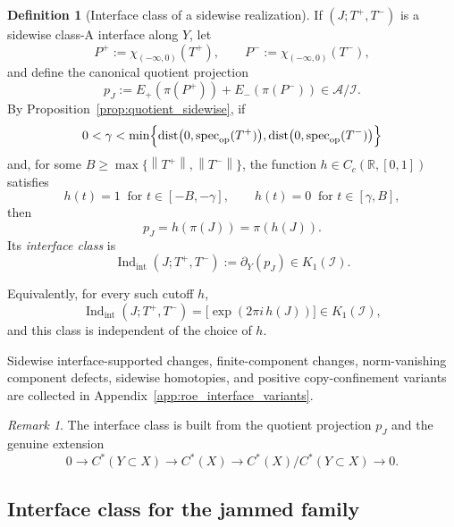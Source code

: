 \documentclass[11pt]{article}
\numberwithin{equation}{section}
\theoremstyle{definition}
\newtheorem{definition}[theorem]{Definition}
\theoremstyle{remark}
\newtheorem{remark}[theorem]{Remark}
\newcommand{\spec}{\mathrm{spec}}
\newcommand{\dist}{\mathrm{dist}}
\newcommand{\opnorm}[1]{\left\lVert#1\right\rVert}
\newcommand{\Indint}{\operatorname{Ind}_{\mathrm{int}}}
\begin{document}
\begin{definition}[Interface class of a sidewise realization]\label{def:interface_class}
If $(J;T^+,T^-)$ is a sidewise class-A interface along $Y$, let
\[
P^+:=\chi_{(-\infty,0)}(T^+),
\qquad
P^-:=\chi_{(-\infty,0)}(T^-),
\]
and define the canonical quotient projection
\[
p_J:=E_+(\pi(P^+))+E_-(\pi(P^-))\in \mathcal A/\mathcal I.
\]
By Proposition~\ref{prop:quotient_sidewise}, if
\[
0<\gamma<\min\Bigl\{\dist\bigl(0,\spec_{\mathrm{op}}(T^+)\bigr),\dist\bigl(0,\spec_{\mathrm{op}}(T^-)\bigr)\Bigr\}
\]
and, for some $B\ge\max\{\opnorm{T^+},\opnorm{T^-}\}$, the function
$h\in C_c(\mathbb R,[0,1])$ satisfies
\[
h(t)=1\ \text{ for }t\in[-B,-\gamma],
\qquad
h(t)=0\ \text{ for }t\in[\gamma,B],
\]
then
\[
p_J=h(\pi(J))=\pi(h(J)).
\]
Its \emph{interface class} is
\[
\Indint(J;T^+,T^-):=\partial_Y(p_J)\in K_1(\mathcal I).
\]

Equivalently, for every such cutoff $h$,
\[
\Indint(J;T^+,T^-)=\bigl[\exp(2\pi i\,h(J))\bigr]\in K_1(\mathcal I),
\]
and this class is independent of the choice of $h$.
\end{definition}

Sidewise interface-supported changes, finite-component changes, norm-vanishing component defects, sidewise homotopies, and positive copy-confinement variants are collected in Appendix~\ref{app:roe_interface_variants}.

\begin{remark}
The interface class is built from the quotient
projection $p_J$ and the genuine extension
\[
0\to C^*(Y\subset X)\to C^*(X)\to C^*(X)/C^*(Y\subset X)\to 0.
\]
\end{remark}

\subsection{Interface class for the jammed family}
\end{document}
